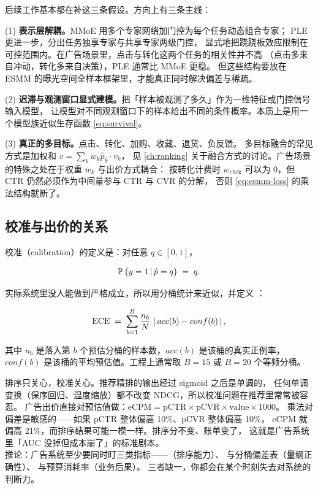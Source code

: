 后续工作基本都在补这三条假设。方向上有三条主线：

(1) \textbf{表示层解耦。}MMoE \cite{ma2018mmoe} 用多个专家网络加门控为每个任务动态组合专家；
PLE \cite{tang2020ple} 更进一步，分出任务独享专家与共享专家两级门控，
显式地把跷跷板效应限制在可控范围内。在广告场景里，点击与转化这两个任务的相关性并不高
（点击多来自冲动，转化多来自决策），PLE 通常比 MMoE 更稳。
但这些结构要放在 ESMM 的曝光空间全样本框架里，才能真正同时解决偏差与稀疏。

(2) \textbf{迟滞与观测窗口显式建模。}把「样本被观测了多久」作为一维特征或门控信号输入模型，
让模型对不同观测窗口下的样本给出不同的条件概率。本质上是用一个模型族近似生存函数 \eqref{eq:survival}。

(3) \textbf{真正的多目标。}点击、转化、加购、收藏、退货、负反馈。
多目标融合的常见方式是加权和 $v = \sum_k w_k \hat{p}_k \cdot v_k$，
见 \cref{ch:ranking} 关于融合方式的讨论。广告场景的特殊之处在于权重 $w_k$ 与出价方式耦合：
按转化计费时 $w_{\text{click}}$ 可以为 0，但 CTR 仍然必须作为中间量参与 CTR 与 CVR 的分解，
否则 \eqref{eq:esmm-loss} 的乘法结构就断了。

\subsection{校准与出价的关系}

校准（calibration）的定义是：对任意 $q \in [0,1]$，

\begin{equation}
\operatorname{\mathbb{P}}\big(y = 1 \,\vert\, \hat{p} = q\big) \;=\; q .
\label{eq:calibration}
\end{equation}

实际系统里没人能做到严格成立，所以用分桶统计来近似，并定义
：

\begin{equation}
\operatorname{ECE} \;=\; \sum_{b=1}^{B} \frac{n_b}{N}\,\left\lvert \, acc(b) - conf(b) \, \right\rvert,
\label{eq:ece}
\end{equation}

其中 $n_b$ 是落入第 $b$ 个预估分桶的样本数，$acc(b)$ 是该桶的真实正例率，
$conf(b)$ 是该桶的平均预估值。工程上通常取 $B = 15$ 或 $B = 20$ 个等频分桶。

\begin{insight}
排序只关心，校准关心。推荐精排的输出经过 sigmoid 之后是单调的，
任何单调变换（保序回归、温度缩放）都不改变 NDCG，所以校准问题在推荐里常常被容忍。
广告出价直接对预估值做：$\mathrm{eCPM} = \mathrm{pCTR} \times \mathrm{pCVR} \times \text{value} \times 1000$。
乘法对偏差是敏感的——如果 pCTR 整体偏高 10\%、pCVR 整体偏高 10\%，
$\mathrm{eCPM}$ 就偏高 21\%，而排序结果可能一模一样。排序分不变、账单变了，
这就是广告系统里「AUC 没掉但成本崩了」的标准剧本。\\
推论：广告系统至少要同时盯三类指标——（排序能力）、
 与分桶偏差表（量纲正确性）、 与预算消耗率（业务后果）。
三者缺一，你都会在某个时刻失去对系统的判断力。
\end{insight}

